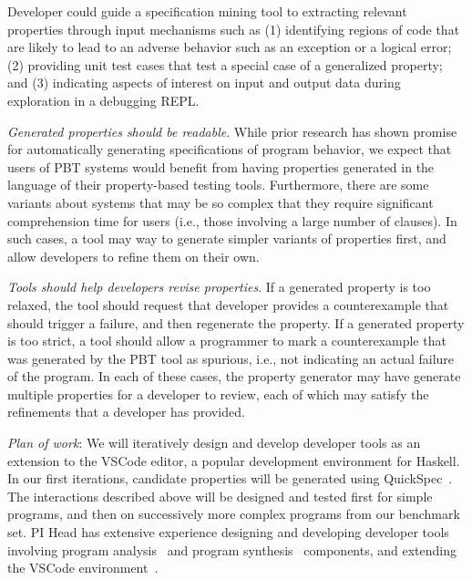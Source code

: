 Developer could guide a specification mining tool to extracting relevant properties through input mechanisms such as (1) identifying regions of code that are likely to lead to an adverse behavior such as an exception or a logical error; (2) providing unit test cases that test a special case of a generalized property; and (3) indicating aspects of interest on input and output data during exploration in a debugging REPL.

\textit{Generated properties should be \emph{readable}}. While prior research has shown promise for automatically generating specifications of program behavior, we expect that users of PBT systems would benefit from having properties generated in the language of their property-based testing tools. Furthermore, there are some variants about systems that may be so complex that they require significant comprehension time for users (i.e., those involving a large number of clauses). In such cases, a tool may way to generate simpler variants of properties first, and allow developers to refine them on their own.

\textit{Tools should help developers \emph{revise} properties}. If a generated property is too relaxed, the tool should request that developer provides a counterexample that should trigger a failure, and then regenerate the property. If a generated property is too strict, a tool should allow a programmer to mark a counterexample that was generated by the PBT tool as spurious, i.e., not indicating an actual failure of the program. In each of these cases, the property generator may have generate multiple properties for a developer to review, each of which may satisfy the refinements that a developer has provided.

\textit{Plan of work}: We will iteratively design and develop developer tools as an extension to the VSCode editor, a popular development environment for Haskell. In our first iterations, candidate properties will be generated using QuickSpec~\cite{claessen2010quickspec}. The interactions described above will be designed and tested first for simple programs, and then on successively more complex programs from our benchmark set. PI Head has extensive experience designing and developing developer tools involving program analysis~\cite{head2018interactive,head2019managing} and program synthesis~\cite{head2017writing} components, and extending the VSCode environment~\cite{head2020composing}.  

